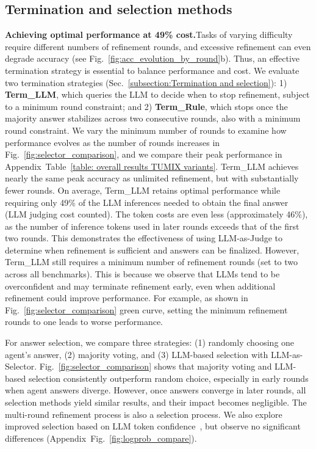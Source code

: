 \subsection{Termination and selection methods}
\label{Sec: Experiments of Termination and selection methods}
\textbf{Achieving optimal performance at 49\% cost.}\quad Tasks of varying difficulty require different numbers of refinement rounds, and excessive refinement can even degrade accuracy (see Fig.~\ref{fig:acc_evolution_by_round}b). Thus, an effective termination strategy is essential to balance performance and cost. We evaluate two termination strategies (Sec.~\ref{subsection:Termination and selection}): 
1) \textbf{Term\_LLM}, which queries the LLM to decide when to stop refinement, subject to a minimum round constraint; and 
2) \textbf{Term\_Rule}, which stops once the majority answer stabilizes across two consecutive rounds, also with a minimum round constraint. We vary the minimum number of rounds to examine how performance evolves as the number of rounds increases in Fig.~\ref{fig:selector_comparison}, and we compare their peak performance in Appendix~Table~\ref{table: overall results TUMIX variants}. Term\_LLM achieves nearly the same peak accuracy as unlimited refinement, but with substantially fewer rounds. On average, Term\_LLM retains optimal performance while requiring only 49\% of the LLM inferences needed to obtain the final answer (LLM judging cost counted). The token costs are even less (approximately 46\%), as the number of inference tokens used in later rounds exceeds that of the first two rounds. This demonstrates the effectiveness of using LLM-as-Judge to determine when refinement is sufficient and answers can be finalized. However, Term\_LLM still requires a minimum number of refinement rounds (set to two across all benchmarks). This is because we observe that LLMs tend to be overconfident and may terminate refinement early, even when additional refinement could improve performance. For example, as shown in Fig.~\ref{fig:selector_comparison} green curve, setting the minimum refinement rounds to one leads to worse performance.

For answer selection, we compare three strategies: (1) randomly choosing one agent’s answer, (2) majority voting, and (3) LLM-based selection with LLM-as-Selector. Fig.~\ref{fig:selector_comparison} shows that majority voting and LLM-based selection consistently outperform random choice, especially in early rounds when agent answers diverge. However, once answers converge in later rounds, all selection methods yield similar results, and their impact becomes negligible. The multi-round refinement process is also a selection process. We also explore improved selection based on LLM token confidence~\citep{fu2025deep}, but observe no significant differences (Appendix~Fig.~\ref{fig:logprob_compare}).

